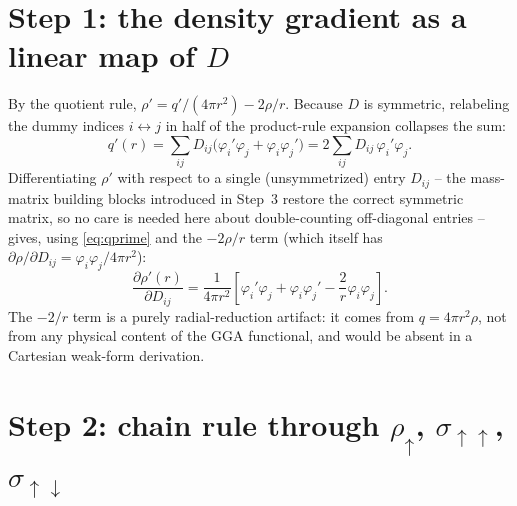 \documentclass[11pt,a4paper]{article}
\begin{document}
\section{Step 1: the density gradient as a linear map of \texorpdfstring{$D$}{D}}

By the quotient rule, $\rho' = q'/(4\pi r^2) - 2\rho/r$. Because $D$ is
symmetric, relabeling the dummy indices $i \leftrightarrow j$ in half of
the product-rule expansion collapses the sum:
\begin{equation}
    q'(r) = \sum_{ij} D_{ij}\big(\varphi_i'\varphi_j + \varphi_i\varphi_j'\big)
          = 2\sum_{ij} D_{ij}\,\varphi_i'\varphi_j .
    \label{eq:qprime}
\end{equation}
Differentiating $\rho'$ with respect to a single (unsymmetrized) entry
$D_{ij}$ -- the mass-matrix building blocks introduced in Step~3 restore
the correct symmetric matrix, so no care is needed here about
double-counting off-diagonal entries -- gives, using \eqref{eq:qprime} and
the $-2\rho/r$ term (which itself has $\partial\rho/\partial D_{ij} =
\varphi_i\varphi_j/4\pi r^2$):
\begin{equation}
    \frac{\partial \rho'(r)}{\partial D_{ij}}
    = \frac{1}{4\pi r^2}\left[\varphi_i'\varphi_j + \varphi_i\varphi_j'
        - \frac{2}{r}\varphi_i\varphi_j\right].
    \label{eq:drhoprime}
\end{equation}
The $-2/r$ term is a purely radial-reduction artifact: it comes from
$q = 4\pi r^2\rho$, not from any physical content of the GGA functional,
and would be absent in a Cartesian weak-form derivation.

\section{Step 2: chain rule through \texorpdfstring{$\rho_\uparrow$, $\sigma_{\uparrow\uparrow}$, $\sigma_{\uparrow\downarrow}$}{rho, sigma-up-up, sigma-up-down}}
\end{document}
